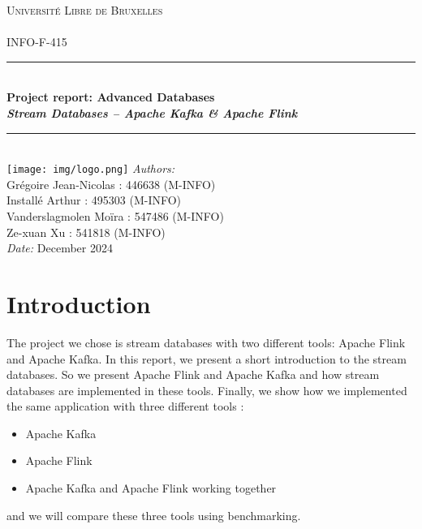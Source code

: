\documentclass[utf8,9pt]{extarticle}
\begin{document}
\begin{titlepage}

\newcommand{\HRule}{\rule{\linewidth}{0.5mm}}   	%
\center 
 
\textsc{\LARGE Université Libre de Bruxelles}\\[1cm]

\textsc{\Large }\\[0.2cm]
\textsc{\large INFO-F-415}\\[1cm] 


\HRule \\[0.8cm]
{ \huge \bfseries Project report: Advanced Databases}\\[0.3cm]
{ \huge \bfseries}
{ \huge \bfseries\textit{Stream Databases – Apache Kafka \& Apache Flink}}\\[0.7cm]
\HRule \\[0.8cm]
\large
\vspace{4cm}
\texttt{[image: img/logo.png]}
\vfill
\emph{Authors:}\\
Grégoire Jean-Nicolas : 446638 (M-INFO)\\ 
Installé Arthur : 495303 (M-INFO) \\
Vanderslagmolen Moïra : 547486 (M-INFO) \\
Ze-xuan Xu : 541818 (M-INFO)\\
\vspace{1cm}
\emph{Date:} December 2024\\
\vfill
\end{titlepage}

\newpage
\tableofcontents
\newpage


\section{Introduction}
\indent \hspace{2mm} The project we chose is stream databases with two different tools: Apache Flink and Apache Kafka. In this report, we present a short introduction to the stream databases. So we present Apache Flink and Apache Kafka and how stream databases are implemented in these tools. Finally, we show how we implemented the same application with three different tools : 
\begin{itemize}
    \item Apache Kafka
    \item Apache Flink
    \item Apache Kafka and Apache Flink working together
\end{itemize}
and we will compare these three tools using benchmarking.
\end{document}
